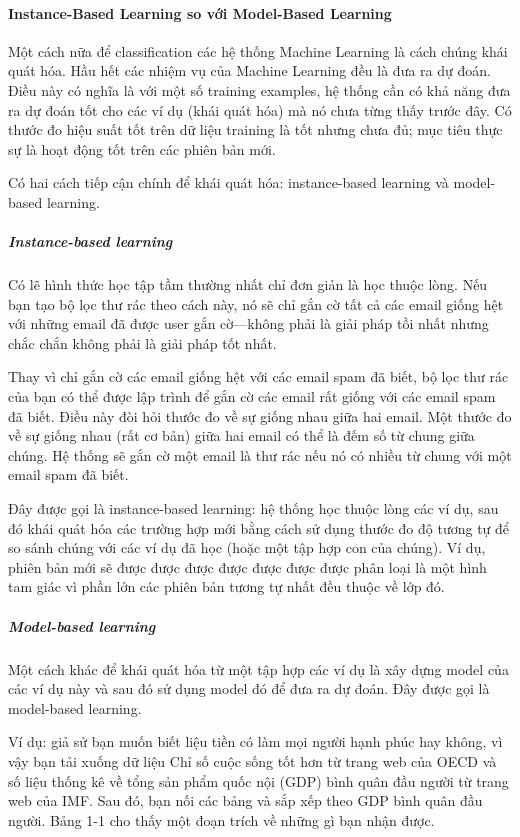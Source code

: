 \paragraph{Instance-Based Learning so với Model-Based Learning}

Một cách nữa để classification các hệ thống Machine Learning là cách chúng khái quát hóa. Hầu hết các nhiệm vụ của Machine Learning đều là đưa ra dự đoán. Điều này có nghĩa là với một số training examples, hệ thống cần có khả năng đưa ra dự đoán tốt cho các ví dụ (khái quát hóa) mà nó chưa từng thấy trước đây. Có thước đo hiệu suất tốt trên dữ liệu training là tốt nhưng chưa đủ; mục tiêu thực sự là hoạt động tốt trên các phiên bản mới.

Có hai cách tiếp cận chính để khái quát hóa: instance-based learning và model-based learning.

\subparagraph{Instance-based learning}

Có lẽ hình thức học tập tầm thường nhất chỉ đơn giản là học thuộc lòng. Nếu bạn tạo bộ lọc thư rác theo cách này, nó sẽ chỉ gắn cờ tất cả các email giống hệt với những email đã được user gắn cờ—không phải là giải pháp tồi nhất nhưng chắc chắn không phải là giải pháp tốt nhất.

Thay vì chỉ gắn cờ các email giống hệt với các email spam đã biết, bộ lọc thư rác của bạn có thể được lập trình để gắn cờ các email rất giống với các email spam đã biết. Điều này đòi hỏi thước đo về sự giống nhau giữa hai email. Một thước đo về sự giống nhau (rất cơ bản) giữa hai email có thể là đếm số từ chung giữa chúng. Hệ thống sẽ gắn cờ một email là thư rác nếu nó có nhiều từ chung với một email spam đã biết.

Đây được gọi là instance-based learning: hệ thống học thuộc lòng các ví dụ, sau đó khái quát hóa các trường hợp mới bằng cách sử dụng thước đo độ tương tự để so sánh chúng với các ví dụ đã học (hoặc một tập hợp con của chúng). Ví dụ, phiên bản mới sẽ được được được được được được được phân loại là một hình tam giác vì phần lớn các phiên bản tương tự nhất đều thuộc về lớp đó.

\subparagraph{Model-based learning}

Một cách khác để khái quát hóa từ một tập hợp các ví dụ là xây dựng model của các ví dụ này và sau đó sử dụng model đó để đưa ra dự đoán. Đây được gọi là model-based learning.

Ví dụ: giả sử bạn muốn biết liệu tiền có làm mọi người hạnh phúc hay không, vì vậy bạn tải xuống dữ liệu Chỉ số cuộc sống tốt hơn từ trang web của OECD và số liệu thống kê về tổng sản phẩm quốc nội (GDP) bình quân đầu người từ trang web của IMF. Sau đó, bạn nối các bảng và sắp xếp theo GDP bình quân đầu người. Bảng 1-1 cho thấy một đoạn trích về những gì bạn nhận được.


